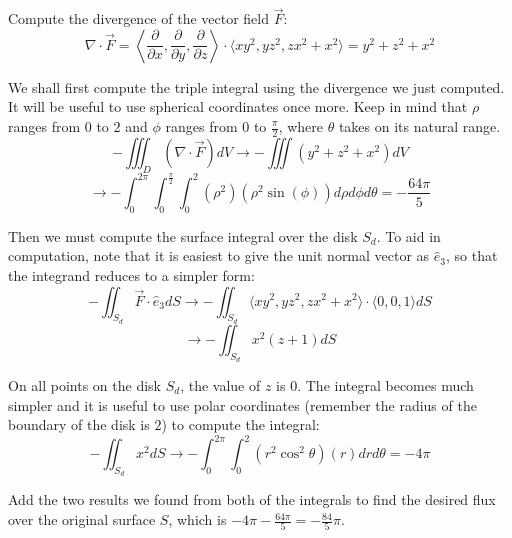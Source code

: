 \documentclass{article}
\begin{document}
Compute the divergence of the vector field $\vec{F}$:
$$\nabla\cdot\vec{F} = \left\langle \frac{\partial}{\partial x}, \frac{\partial}{\partial y} ,\frac{\partial}{\partial z} \right\rangle \cdot \langle xy^2, yz^2,zx^2+x^2 \rangle= y^2+z^2+x^2$$

We shall first compute the triple integral using the divergence we just computed. It will be useful to use spherical coordinates once more. Keep in mind that $\rho$ ranges from $0$ to $2$ and $\phi$ ranges from $0$ to $\frac{\pi}{2}$, where $\theta$ takes on its natural range.
$$-\iiint_D \left(\nabla \cdot \vec{F}\right) dV \to -\iiint (y^2+z^2+x^2) dV$$
$$ \to -\int_0^{2\pi}\int_0^{\frac{\pi}{2}}\int_0^2 (\rho^2)(\rho^2\sin(\phi))d\rho d\phi d\theta = -\frac{64\pi}{5}$$

Then we must compute the surface integral over the disk $S_d$. To aid in computation, note that it is easiest to give the unit normal vector as $\hat{e}_3$, so that the integrand reduces to a simpler form:
$$-\iint_{S_d} \vec{F}\cdot\hat{e}_3 dS \to -\iint_{S_d}\langle xy^2, yz^2,zx^2+x^2 \rangle \cdot \langle0,0,1\rangle dS $$
$$\to -\iint_{S_d} x^2(z+1)dS$$

On all points on the disk $S_d$, the value of $z$ is $0$. The integral becomes much simpler and it is useful to use polar coordinates (remember the radius of the boundary of the disk is $2$) to compute the integral:
$$-\iint_{S_d}x^2dS\to -\int_0^{2\pi}\int_0^2 (r^2\cos^2{\theta})(r)drd\theta = -4\pi$$

Add the two results we found from both of the integrals to find the desired flux over the original surface $S$, which is $-4\pi - \frac{64\pi}{5} = -\frac{84}{5}\pi$.
\end{document}

